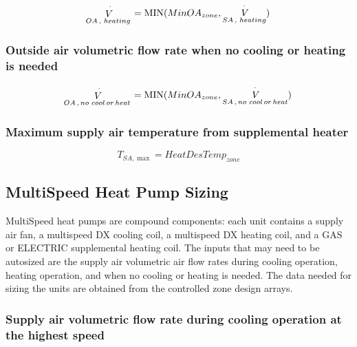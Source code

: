 \begin{equation}
{\mathop V\limits^ \cdot_{OA\,,\,\,heating}} = {\rm{MIN}}(MinO{A_{zone}},{\mathop {\,V}\limits^ \cdot_{SA\,,\,\,heating}})
\end{equation}

\subsubsection{Outside air volumetric flow rate when no cooling or heating is needed}\label{outside-air-volumetric-flow-rate-when-no-cooling-or-heating-is-needed}

\begin{equation}
{\mathop V\limits^ \cdot_{OA\,,\,no\,\,cool\,or\,heat}} = {\rm{MIN}}(MinO{A_{zone}},{\mathop {\,V}\limits^ \cdot_{SA\,,\,no\,\,cool\,or\,heat}})
\end{equation}

\subsubsection{Maximum supply air temperature from supplemental heater}\label{maximum-supply-air-temperature-from-supplemental-heater}

\begin{equation}
{T_{SA,\max }} = HeatDesTem{p_{zone}}
\end{equation}

\subsection{MultiSpeed Heat Pump Sizing}\label{multispeed-heat-pump-sizing}

MultiSpeed heat pumps are compound components: each unit contains a supply air fan, a multispeed DX cooling coil, a multispeed DX heating coil, and a GAS or ELECTRIC supplemental heating coil. The inputs that may need to be autosized are the supply air volumetric air flow rates during cooling operation, heating operation, and when no cooling or heating is needed. The data needed for sizing the units are obtained from the controlled zone design arrays.

\subsubsection{Supply air volumetric flow rate during cooling operation at the highest speed}\label{supply-air-volumetric-flow-rate-during-cooling-operation-at-the-highest-speed}

